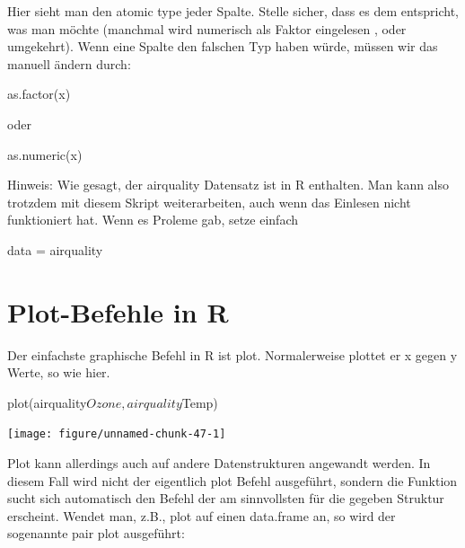 \documentclass[a4paper,twoside]{tufte-book}\usepackage[]{graphicx}\usepackage[]{color}
\begin{document}
\begin{appendices}
Hier sieht man den atomic type jeder Spalte. Stelle sicher, dass es dem entspricht, was man möchte (manchmal wird numerisch als Faktor eingelesen , oder umgekehrt). Wenn eine Spalte den falschen Typ haben würde, müssen wir das manuell ändern durch:

\begin{Schunk}
\begin{Sinput}
as.factor(x)
\end{Sinput}
\end{Schunk}

oder

\begin{Schunk}
\begin{Sinput}
as.numeric(x)
\end{Sinput}
\end{Schunk}

Hinweis: Wie gesagt, der airquality Datensatz ist in R enthalten. Man kann also trotzdem mit diesem Skript weiterarbeiten, auch wenn das Einlesen nicht funktioniert hat. Wenn es Proleme gab, setze einfach

\begin{Schunk}
\begin{Sinput}
data = airquality
\end{Sinput}
\end{Schunk}


\section{Plot-Befehle in R}

Der einfachste graphische Befehl in R ist plot. Normalerweise plottet er x gegen y Werte, so wie hier.

\begin{Schunk}
\begin{Sinput}
plot(airquality$Ozone, airquality$Temp)
\end{Sinput}


{\centering \texttt{[image: figure/unnamed-chunk-47-1]} 

}

\end{Schunk}

Plot kann allerdings auch auf andere Datenstrukturen angewandt werden. In diesem Fall wird nicht der eigentlich plot Befehl ausgeführt, sondern die Funktion sucht sich automatisch den Befehl der am sinnvollsten für die gegeben Struktur erscheint. Wendet man, z.B., plot auf einen data.frame an, so wird der sogenannte pair plot ausgeführt:



\end{appendices}
\end{document}
